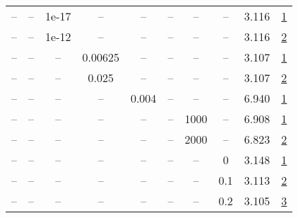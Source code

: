 \begin{table}[H]
\begin{tabular}{cccccccccc}
-- & -- & 1e-17 & -- & -- & -- & -- & -- & 3.116 & \href{https://wandb.ai/stanford-mercury/optimizer-scaling/runs/sweep-520m-10B-sophia7e95a0lr0.002-wd0.3-minlr0-warmup4000-b10.9-a73991}{1} \\
-- & -- & 1e-12 & -- & -- & -- & -- & -- & 3.116 & \href{https://wandb.ai/stanford-mercury/optimizer-scaling/runs/sweep-520m-10B-sophia60cf61lr0.002-wd0.3-minlr0-warmup4000-b10.9-29e8f1}{2} \\
-- & -- & -- & 0.00625 & -- & -- & -- & -- & 3.107 & \href{https://wandb.ai/stanford-mercury/optimizer-scaling/runs/sweep-520m-10B-sophia3cb06elr0.002-wd0.3-minlr0-warmup4000-b10.9-fe954a}{1} \\
-- & -- & -- & 0.025 & -- & -- & -- & -- & 3.107 & \href{https://wandb.ai/stanford-mercury/optimizer-scaling/runs/sweep-520m-10B-sophia2ff52dlr0.002-wd0.3-minlr0-warmup4000-b10.9-5a41f7}{2} \\
-- & -- & -- & -- & 0.004 & -- & -- & -- & 6.940 & \href{https://wandb.ai/stanford-mercury/optimizer-scaling/runs/sweep-520m-10B-sophiaa0c3e4lr0.004-wd0.3-minlr0-warmup4000-b10.9-44481e}{1} \\
-- & -- & -- & -- & -- & -- & 1000 & -- & 6.908 & \href{https://wandb.ai/stanford-mercury/optimizer-scaling/runs/sweep-520m-10B-sophiaf5bf56lr0.002-wd0.3-minlr0-warmup1000-b10.9-004174}{1} \\
-- & -- & -- & -- & -- & -- & 2000 & -- & 6.823 & \href{https://wandb.ai/stanford-mercury/optimizer-scaling/runs/sweep-520m-10B-sophia9787f8lr0.002-wd0.3-minlr0-warmup2000-b10.9-184312}{2} \\
-- & -- & -- & -- & -- & -- & -- & 0 & 3.148 & \href{https://wandb.ai/stanford-mercury/optimizer-scaling/runs/sweep-520m-10B-sophia803389lr0.002-wd0-minlr0-warmup4000-b10.95--bb80cc}{1} \\
-- & -- & -- & -- & -- & -- & -- & 0.1 & 3.113 & \href{https://wandb.ai/stanford-mercury/optimizer-scaling/runs/sweep-520m-10B-sophia875379lr0.002-wd0.1-minlr0-warmup4000-b10.9-29288d}{2} \\
-- & -- & -- & -- & -- & -- & -- & 0.2 & 3.105 & \href{https://wandb.ai/stanford-mercury/optimizer-scaling/runs/sweep-520m-10B-sophiac53c62lr0.002-wd0.2-minlr0-warmup4000-b10.9-c330ae}{3} \\
\bottomrule
\end{tabular}
\end{table}

